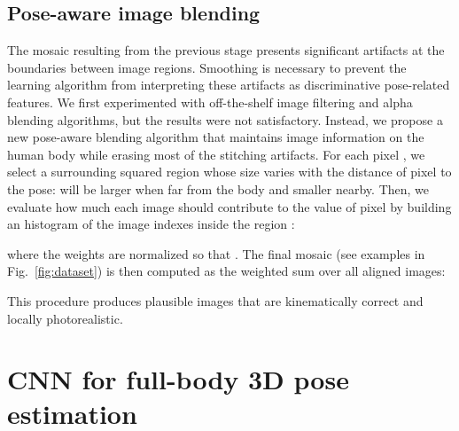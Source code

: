 \documentclass{article}
\begin{document}
 
 
 
 \subsection{Pose-aware image blending}
 
The mosaic  resulting from the previous stage presents significant artifacts at the boundaries between image regions. Smoothing is necessary to prevent the learning algorithm from interpreting these artifacts as discriminative pose-related features. We first experimented with off-the-shelf image filtering and alpha blending algorithms, but the results were not satisfactory. Instead, we propose a new pose-aware blending algorithm that maintains image information on the human body while erasing most of the stitching artifacts. 
For each pixel , we select a surrounding squared region  whose size varies with the distance of pixel  to the pose:  will be larger when far from the body and smaller nearby. Then, we evaluate how much each image  should contribute to the value of pixel  by building an histogram of the image indexes inside the region :
 
 where the weights are normalized so that . The final mosaic  (see examples in Fig.~\ref{fig:dataset}) is then computed as the weighted sum over all aligned images:
 
This procedure produces plausible images that are kinematically correct and locally photorealistic. 

 \section{CNN for full-body 3D pose estimation}
 
\end{document}
